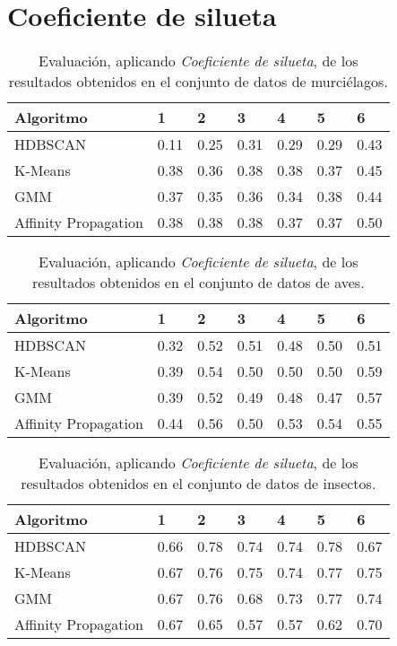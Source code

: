 \section{Coeficiente de silueta}\label{sec:silhouette-evaluation}

\begin{table}[H]
    \centering
    \begin{tabular}{lllllll}
        \hline
        Algoritmo & 1 & 2 & 3 & 4 & 5 & 6  \\ \hline
        HDBSCAN & 0.11 & 0.25 & 0.31 & 0.29 & 0.29 & 0.43 \\
        K-Means & 0.38 & 0.36 & 0.38 & 0.38 & 0.37 & 0.45 \\
        GMM & 0.37 & 0.35 & 0.36 & 0.34 & 0.38 & 0.44 \\
        Affinity Propagation & 0.38 & 0.38 & 0.38 & 0.37 & 0.37 & \cellcolor[HTML]{FFFC9E}0.50 \\
    \end{tabular}
    \caption{Evaluación, aplicando \textit{Coeficiente de silueta}, de los resultados obtenidos en el conjunto de datos de murciélagos.}
    \label{table:bats-silhouette}
\end{table}

\begin{table}[H]
    \centering
    \begin{tabular}{lllllll}
        \hline
        Algoritmo & 1 & 2 & 3 & 4 & 5 & 6  \\ \hline
        HDBSCAN & 0.32 & 0.52 & 0.51 & 0.48 & 0.50 & 0.51 \\
        K-Means & 0.39 & 0.54 & 0.50 & 0.50 & 0.50 & \cellcolor[HTML]{FFFC9E}0.59 \\
        GMM & 0.39 & 0.52 & 0.49 & 0.48 & 0.47 & 0.57 \\
        Affinity Propagation & 0.44 & 0.56 & 0.50 & 0.53 & 0.54 & 0.55 \\
    \end{tabular}
    \caption{Evaluación, aplicando \textit{Coeficiente de silueta}, de los resultados obtenidos en el conjunto de datos de aves.}
    \label{table:birds-silhouette}
\end{table}

\begin{table}[H]
    \centering
    \begin{tabular}{lllllll}
        \hline
        Algoritmo & 1 & 2 & 3 & 4 & 5 & 6  \\ \hline
        HDBSCAN & 0.66 & \cellcolor[HTML]{FFFC9E}0.78 & 0.74 & 0.74 & \cellcolor[HTML]{FFFC9E}0.78 & 0.67 \\
        K-Means & 0.67 & 0.76 & 0.75 & 0.74 & 0.77 & 0.75 \\
        GMM & 0.67 & 0.76 & 0.68 & 0.73 & 0.77 & 0.74 \\
        Affinity Propagation & 0.67 & 0.65 & 0.57 & 0.57 & 0.62 & 0.70 \\
    \end{tabular}
    \caption{Evaluación, aplicando \textit{Coeficiente de silueta}, de los resultados obtenidos en el conjunto de datos de insectos.}
    \label{table:insects-silhouette}
\end{table}

